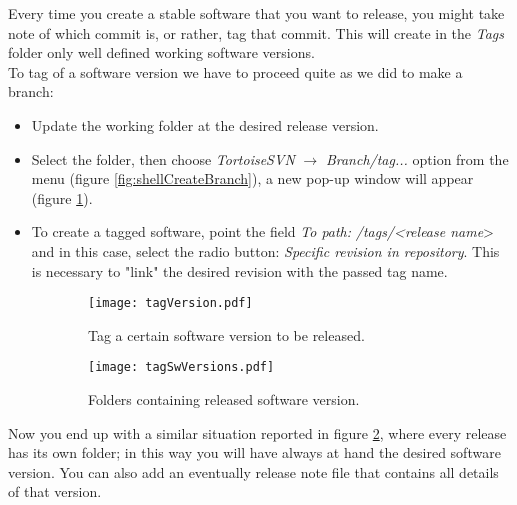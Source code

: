 Every time you create a stable software that you want to release, you might take note of which commit is, or rather, tag that commit. This will create in the \textit{Tags} folder only well defined working software versions.\\

To tag of a software version we have to proceed quite as we did to make a branch:

\begin{itemize}

    \item Update the working folder at the desired release version.

    \item Select the folder, then choose \textit{TortoiseSVN} $\rightarrow$ \textit{Branch/tag...} option from the menu (figure \ref{fig:shellCreateBranch}), a new pop-up window will appear (figure \ref{fig:tagVersion}).
    
    \item To create a tagged software, point the field \textit{To path:} \textit{/tags/<release name}> and in this case, select the radio button: \textit{Specific revision in repository}. This is necessary to "link" the desired revision with the passed tag name.
    
\end{itemize}




\begin{figure}[htbp]
\begin{subfigure}{0.5\textwidth}
  \centering
    \texttt{[image: tagVersion.pdf]}
    \caption{Tag a certain software version to be released.}
    \label{fig:tagVersion}
\end{subfigure}%
\begin{subfigure}{0.5\textwidth}
  \centering
    \texttt{[image: tagSwVersions.pdf]}
    \caption{Folders containing released software version.}
    \label{fig:tagSwVersions}
\end{subfigure}%
\caption{}
\label{fig:tagVersionWindows}
\end{figure}


\newpage
Now you end up with a similar situation reported in figure \ref{fig:tagSwVersions}, where every release has its own folder; in this way you will have always at hand the desired software version. You can also add an eventually release note file that contains all details of that version.






